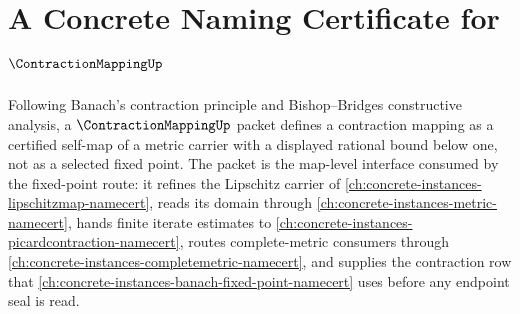 \chapter{A Concrete Naming Certificate for $\ContractionMappingUp$}
\label{ch:concrete-instances-contractionmapping-namecert}

Following Banach's contraction principle and Bishop--Bridges constructive analysis, a $\ContractionMappingUp$ packet defines a contraction mapping as a certified self-map of a metric carrier with a displayed rational bound below one, not as a selected fixed point. The packet is the map-level interface consumed by the fixed-point route: it refines the Lipschitz carrier of \autoref{ch:concrete-instances-lipschitzmap-namecert}, reads its domain through \autoref{ch:concrete-instances-metric-namecert}, hands finite iterate estimates to \autoref{ch:concrete-instances-picardcontraction-namecert}, routes complete-metric consumers through \autoref{ch:concrete-instances-completemetric-namecert}, and supplies the contraction row that \autoref{ch:concrete-instances-banach-fixed-point-namecert} uses before any endpoint seal is read.

